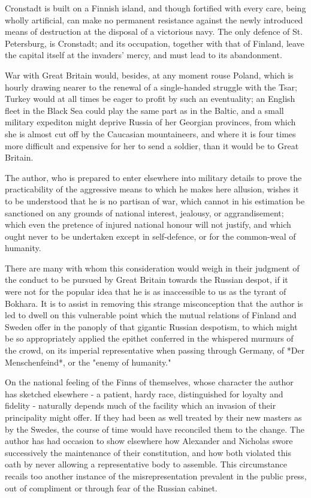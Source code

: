 \documentclass[10pt,a4paper]{article}
\begin{document}
Cronstadt is built on a Finnish island, and though fortified with every care, being wholly artificial, can make no permanent resistance against the newly introduced means of destruction at the disposal of a victorious navy. The only defence of St. Petersburg, is Cronstadt; and its occupation, together with that of Finland, leave the capital itself at the invaders' mercy, and must lead to its abandonment.

War with Great Britain would, besides, at any moment rouse Poland, which is hourly drawing nearer to the renewal of a single-handed struggle with the Tsar; Turkey would at all times be eager to profit by such an eventuality; an English fleet in the Black Sea could play the same part as in the Baltic, and a small military expediton might deprive Russia of her Georgian provinces, from which she is almost cut off by the Caucasian mountaineers, and where it is four times more difficult and expensive for her to send a soldier, than it would be to Great Britain.

The author, who is prepared to enter elsewhere into military details to prove the practicability of the aggressive means to which he makes here allusion, wishes it to be understood that he is no partisan of war, which cannot in his estimation be sanctioned on any grounds of national interest, jealousy, or aggrandisement; which even the pretence of injured national honour will not justify, and which ought never to be undertaken except in self-defence, or for the common-weal of humanity.

There are many with whom this consideration would weigh in their judgment of the conduct to be pursued by Great Britain towards the Russian despot, if it were not for the popular idea that he is as inaccessible to us as the tyrant of Bokhara. It is to assist in removing this strange misconception that the author is led to dwell on this vulnerable point which the mutual relations of Finland and Sweden offer in the panoply of that gigantic Russian despotism, to which might be so appropriately applied the epithet conferred in the whispered murmurs of the crowd, on its imperial representative when passing through Germany, of *Der Menschenfeind*, or the "enemy of humanity."

On the national feeling of the Finns of themselves, whose character the author has sketched elsewhere - a patient, hardy race, distinguished for loyalty and fidelity - naturally depends much of the facility which an invasion of their principality might offer. If they had been as well treated by their new masters as by the Swedes, the course of time would have reconciled them to the change. The author has had occasion to show elsewhere how Alexander and Nicholas swore successively the maintenance of their constitution, and how both violated this oath by never allowing a representative body to assemble. This circumstance recails too another instance of the misrepresentation prevalent in the public press, out of compliment or through fear of the Russian cabinet.
\end{document}

